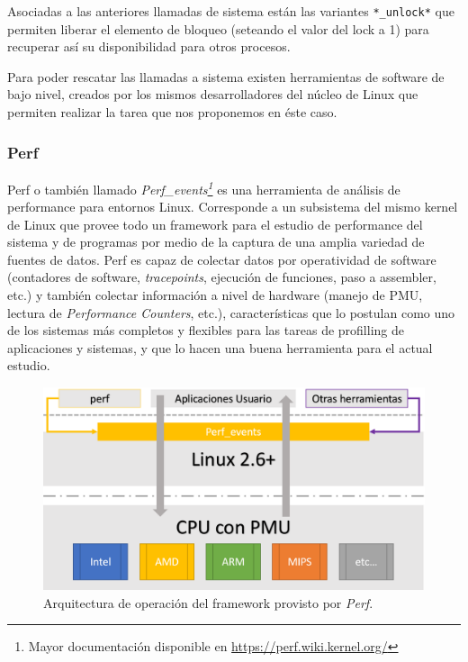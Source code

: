 Asociadas a las anteriores llamadas de sistema están las variantes \verb=*_unlock*= que permiten liberar el elemento de bloqueo (seteando el valor del lock a 1) para recuperar así su disponibilidad para otros procesos.

Para poder rescatar las llamadas a sistema existen herramientas de software de bajo nivel, creados por los mismos desarrolladores del núcleo de Linux que permiten realizar la tarea que nos proponemos en éste caso.

\subsubsection{Perf}
Perf \cite{slides:perfTools} o también llamado \emph{Perf\_events\footnote{Mayor documentación disponible en \url{https://perf.wiki.kernel.org/}}} es una herramienta de análisis de performance para entornos Linux. Corresponde a un subsistema del mismo kernel de Linux que provee todo un framework para el estudio de performance del sistema y de programas por medio de la captura de una amplia variedad de fuentes de datos. Perf es capaz de colectar datos por operatividad de software (contadores de software, \emph{tracepoints}, ejecución de funciones, paso a assembler, etc.) y también colectar información a nivel de hardware (manejo de PMU, lectura de \emph{Performance Counters}, etc.), características que lo postulan como uno de los sistemas más completos y flexibles para las tareas de profilling de aplicaciones y sistemas, y que lo hacen una buena herramienta para el actual estudio.

\begin{figure}[!h]
	\centering
	\includegraphics[scale=.45]{imagenes/perfArchitecture.png}
	\caption{Arquitectura de operación del framework provisto por \emph{Perf}.}
	\label{fig:perfFramework}
\end{figure}

